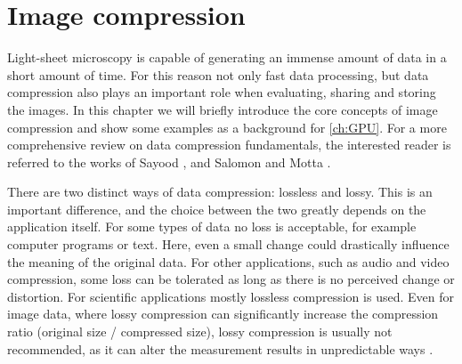 


  \graphicspath{{./figures/3_processing/}}

  
  
  \chapter{Image compression}
  \label{ch:compr}
    Light-sheet microscopy is capable of generating an immense amount of data in a short amount of time. For this reason not only fast data processing, but data compression also plays an important role when evaluating, sharing and storing the images. In this chapter we will briefly introduce the core concepts of image compression and show some examples as a background for \autoref{ch:GPU}. For a more comprehensive review on data compression fundamentals, the interested reader is referred to the works of Sayood \cite{sayood_introduction_2012}, and Salomon and Motta \cite{salomon_handbook_2010}.
   
    There are two distinct ways of data compression: lossless and lossy. This is an important difference, and the choice between the two greatly depends on the application itself. For some types of data no loss is acceptable, for example computer programs or text. Here, even a small change could drastically influence the meaning of the original data. For other applications, such as audio and video compression, some loss can be tolerated as long as there is no perceived change or distortion. For scientific applications mostly lossless compression is used. Even for image data, where lossy compression can significantly increase the compression ratio (original size / compressed size), lossy compression is usually not recommended, as it can alter the measurement results in unpredictable ways \cite{cromey_digital_2013}.
  
